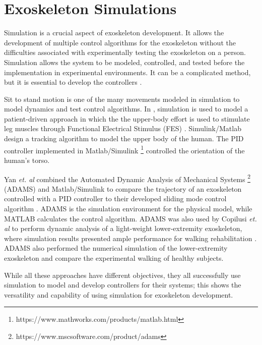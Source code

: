 \section{Exoskeleton Simulations}
Simulation is a crucial aspect of exoskeleton development. It allows the development of multiple control algorithms for the exoskeleton without the difficulties associated with experimentally testing the exoskeleton on a person. Simulation allows the system to be modeled, controlled, and tested before the implementation in experimental environments. It can be a complicated method, but it is essential to develop the controllers \cite{ZLAJPAH2008879}.   

Sit to stand motion is one of the many movements modeled in simulation to model dynamics and test control algorithms. In \cite{reiner1998patient}, simulation is used to model a patient-driven approach in which the the upper-body effort is used to stimulate leg muscles through Functional Electrical Stimulus (FES) \cite{lynch2008functional} \cite{rushton1997functional}. Simulink/Matlab design a tracking algorithm to model the upper body of the human. The PID controller implemented in Matlab/Simulink \footnote{https://www.mathworks.com/products/matlab.html} controlled the orientation of the human's torso. 

Yan \textit{et. al} combined the Automated Dynamic Analysis of Mechanical Systems \footnote{https://www.mscsoftware.com/product/adams} (ADAMS) and Matlab/Simulink to compare the trajectory of an exoskeleton controlled with a PID controller to their developed sliding mode control algorithm \cite{Yan_2017}. ADAMS is the simulation environment for the physical model, while MATLAB calculates the control algorithm. ADAMS was also used by Copilusi \textit{et. al} to perform dynamic analysis of a light-weight lower-extremity exoskeleton, where simulation results presented ample performance for walking rehabilitation  \cite{copilusi2014}. ADAMS also performed the numerical simulation \cite{geonea2017design} of the lower-extremity exoskeleton and compare the experimental walking of healthy subjects. 

While all these approaches have different objectives, they all successfully use simulation to model and develop controllers for their systems;   this shows the versatility and capability of using simulation for exoskeleton development. 
